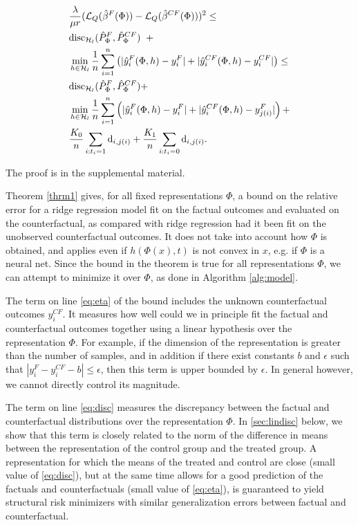 \begin{theorem}
\begin{align}
&\frac{\lambda}{\mu r} (\mathcal{L}_{Q}(\hat{\beta}^F(\Phi))-\mathcal{L}_{Q}(\hat{\beta}^{CF}(\Phi)))^2 \leq \nonumber \\
& \text{disc}_{\mathcal{H}_l}(\hat{P}_\Phi^{F},\hat{P}_\Phi^{CF}) \;\; + \label{eq:disc} \\
& \min_{h\in \mathcal{H}_l} \frac{1}{n} \sum_{i=1}^n \left( | \hat{y}_i^F(\Phi,h)- y_i^F |  + |\hat{y}_i^{CF}(\Phi,h)  - y_i^{CF}|\right)\label{eq:eta} \leq \\
& \text{disc}_{\mathcal{H}_l}(\hat{P}_\Phi^{F},\hat{P}_\Phi^{CF}) + \nonumber \\
& \min_{h\in \mathcal{H}_l} \frac{1}{n} \sum_{i=1}^n \left( | \hat{y}_i^F(\Phi,h)- y_i^F |  + |\hat{y}_i^{CF}(\Phi,h)  - y_{j(i)}^F|\right) + \label{eq:g}\\
& \frac{K_0}{n} \sum_{i: t_i=1} \mathrm{d}_{i,j(i)} + \frac{K_1}{n} \sum_{i: t_i=0} \mathrm{d}_{i,j(i)} \label{eq:nn} .
\end{align}
\end{theorem}

The proof is in the supplemental material.

Theorem \ref{thrm1} gives, for all fixed representations $\Phi$, a bound on the relative error for a ridge regression model fit on the factual outcomes and evaluated on the counterfactual, as compared with ridge regression had it been fit on the unobserved counterfactual outcomes. It does not take into account how $\Phi$ is obtained, and applies even if $h(\Phi(x),t)$ is not convex in $x$, e.g. if $\Phi$ is a neural net. Since the bound in the theorem is true for all representations $\Phi$, we can attempt to minimize it over $\Phi$, as done in Algorithm \ref{alg:model}.

The term on line \eqref{eq:eta} of the bound includes the unknown counterfactual outcomes $y^{CF}_i$. It measures how well could we in principle fit the factual and counterfactual outcomes together using a linear hypothesis over the representation $\Phi$. For example, if the dimension of the representation is greater than the number of samples, and in addition if there exist constants $b$ and $\epsilon$ such that $|y_i^F - y_i^{CF} - b| \leq \epsilon$, then this term is upper bounded by $\epsilon$. In general however, we cannot directly control its magnitude.

The term on line \eqref{eq:disc} measures the discrepancy between the factual and counterfactual distributions over the representation $\Phi$. In \ref{sec:lindisc} below, we show that this term is closely related to the norm of the difference in means between the representation of the control group and the treated group. A representation for which the means of the treated and control are close (small value of \eqref{eq:disc}), but at the same time allows for a good prediction of the factuals and counterfactuals (small value of \eqref{eq:eta}), is guaranteed to yield structural risk minimizers with similar generalization errors between factual and counterfactual.

